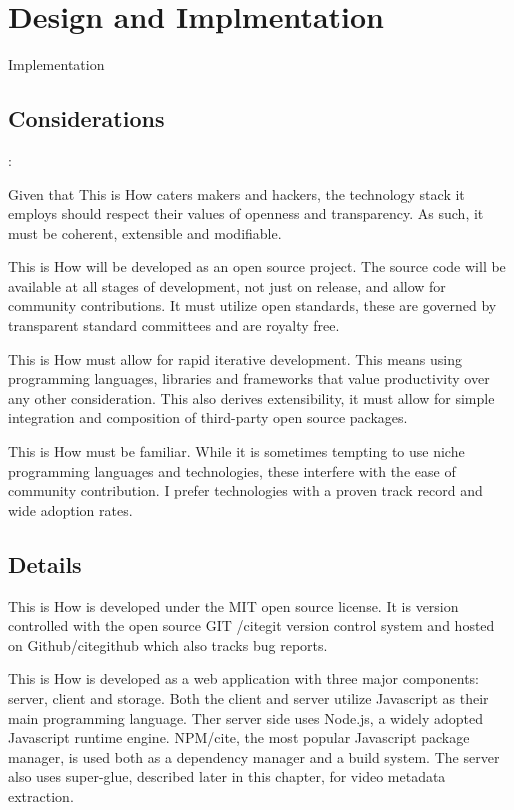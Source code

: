 \chapter{Design and Implmentation}
\label{chap_design}

Implementation 

\section{Considerations}:

Given that This is How caters makers and hackers, the technology stack it employs should respect their values of openness and transparency. As such, it must be coherent, extensible and modifiable.
 
This is How will be developed as an open source project. The source code will be available at all stages of development, not just on release, and allow for community contributions. It must utilize open standards, these are governed by transparent standard committees and are royalty free. 

This is How must allow for rapid iterative development. This means using programming languages, libraries and frameworks that value productivity over any other consideration. This also derives extensibility, it must allow for simple integration and composition of third-party open source packages. 

This is How must be familiar. While it is sometimes tempting to use niche programming languages and technologies, these interfere with the ease of community contribution. I prefer technologies with a proven track record and wide adoption rates.

\section{Details}

This is How is developed under the MIT open source license. It is version controlled with the open source GIT /cite{git} version control system and hosted on Github/cite{github} which also tracks bug reports. 

This is How is developed as a web application with three major components: server, client and storage. Both the client and server utilize Javascript as their main programming language. Ther server side uses Node.js, a widely adopted Javascript runtime engine. NPM/cite{}, the most popular Javascript package manager, is used both as a dependency manager and a build system. The server also uses super-glue, described later in this chapter, for video metadata extraction.

